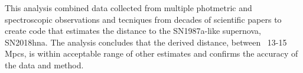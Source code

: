 This analysis combined data collected from multiple photmetric and spectroscopic observations and tecniques 
from decades of scientific papers\cite{mitchell_locating_2023}\cite{matthews_optical_1963} to create code that estimates the distance to the SN1987a-like supernova, 
SN2018hna. The analysis concludes that the derived distance, between ~13-15 Mpcs, is within acceptable range 
of other estimates and confirms the accuracy of the data and method.
